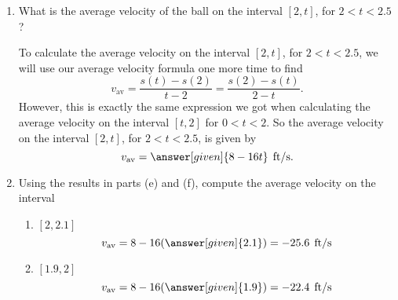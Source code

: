 \documentclass{ximera}
\begin{document}
\begin{example}
\begin{enumerate}
\begin{explanation}
\begin{image}
\end{image}
\end{explanation}


\item What is the average velocity of the ball on the interval $[2,t]$, for
$2<t<2.5$?

\begin{explanation}

To calculate the average velocity on the interval $[2,t]$, for 
$2<t<2.5$, we will use our average velocity formula one more time
to find
\[
v_{\text{av}} = \frac{s(t)-s(2)}{t-2} = \frac{s(2)-s(t)}{2-t}. 
\]
However, this is exactly the same expression we got when calculating
the average velocity on the interval $[t,2]$ for $0<t<2$.  So the 
average velocity on the interval $[2,t]$, for $2<t<2.5$, is given by
\[
v_{\text{av}} =\answer[given]{8-16t}\hspace{0.06in}\text{ft/s}.
\]
\end{explanation}
\item Using the results in parts (e) and (f), compute the average velocity on the interval
\begin{enumerate}
\item $[2, 2.1]$
\[
v_{\text{av}} =  8-16(\answer[given]{2.1})=-25.6 \hspace{0.06in}\text{ft/s}
\]
\item $[1.9,2]$
\[
v_{\text{av}} =  8-16(\answer[given]{1.9})=-22.4 \hspace{0.06in}\text{ft/s}
\]
\end{enumerate}
\end{enumerate}
\end{example}
\end{document}
